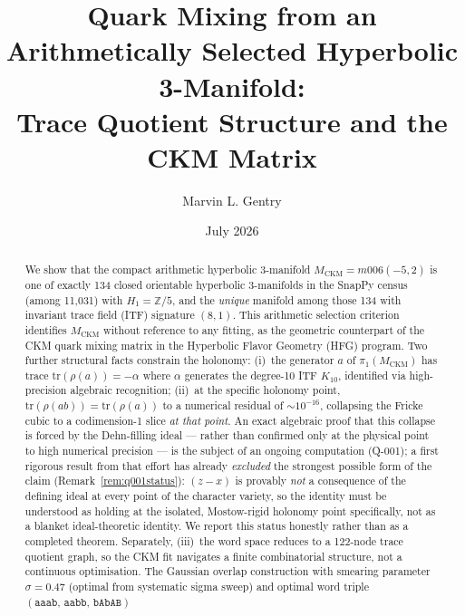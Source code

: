 \documentclass[11pt,a4paper]{article}
\theoremstyle{remark}
\newcommand{\MCKM}{M_{\mathrm{CKM}}}
\newcommand{\Kten}{K_{10}}
\begin{document}
\title{Quark Mixing from an Arithmetically Selected Hyperbolic 3-Manifold:\\
Trace Quotient Structure and the CKM Matrix}

\author[1]{Marvin L. Gentry}
\date{July 2026}
\maketitle

\begin{abstract}
We show that the compact arithmetic hyperbolic 3-manifold
$\MCKM = m006(-5,2)$ is one of exactly 134 closed orientable hyperbolic
3-manifolds in the SnapPy census (among 11,031) with $H_1 = \mathbb{Z}/5$,
and the \emph{unique} manifold among those 134 with invariant trace field
(ITF) signature $(8,1)$.
This arithmetic selection criterion identifies $\MCKM$ without reference to
any fitting, as the geometric counterpart of the CKM quark mixing matrix in
the Hyperbolic Flavor Geometry (HFG) program.
Two further structural facts constrain the holonomy:
(i)~the generator $a$ of $\pi_1(\MCKM)$ has trace $\mathrm{tr}(\rho(a)) = -\alpha$
where $\alpha$ generates the degree-10 ITF $\Kten$, identified via
high-precision algebraic recognition;
(ii)~at the specific holonomy point, $\mathrm{tr}(\rho(ab)) = \mathrm{tr}(\rho(a))$
to a numerical residual of $\sim 10^{-16}$, collapsing the Fricke cubic to a
codimension-1 slice \emph{at that point}.
An exact algebraic proof that this collapse is forced by the Dehn-filling
ideal --- rather than confirmed only at the physical point to high numerical
precision --- is the subject of an ongoing computation (Q-001); a first
rigorous result from that effort has already \emph{excluded} the strongest
possible form of the claim (Remark~\ref{rem:q001status}): $(z-x)$ is
provably \emph{not} a consequence of the defining ideal at every point of
the character variety, so the identity must be understood as holding at the
isolated, Mostow-rigid holonomy point specifically, not as a blanket
ideal-theoretic identity.
We report this status honestly rather than as a completed theorem.
Separately, (iii)~the word space reduces to a 122-node trace quotient graph,
so the CKM fit navigates a finite combinatorial structure, not a
continuous optimisation.
The Gaussian overlap construction with smearing parameter $\sigma = 0.47$
(optimal from systematic sigma sweep)
and optimal word triple $(\mathtt{aaab},\, \mathtt{aabb},\, \mathtt{bAbAB})$

\end{abstract}
\end{document}
